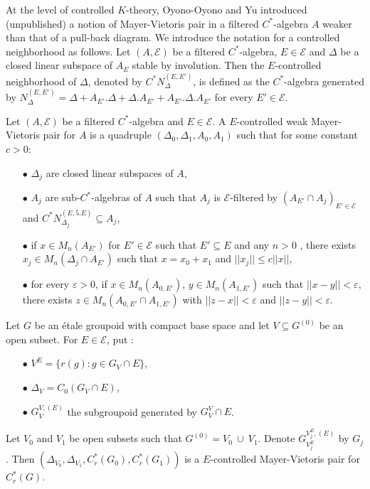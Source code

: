 At the level of controlled $K$-theory, Oyono-Oyono and Yu introduced (unpublished) a notion of Mayer-Vietoris pair in a filtered $C^*$-algebra $A$ weaker than that of a pull-back diagram. We introduce the notation for a controlled neighborhood as follows. Let $(A,\mathcal E)$ be a filtered $C^*$-algebra, $E\in\mathcal E$ and $\Delta$ be a closed linear subspace of $A_E$ stable by involution. Then the $E$-controlled neighborhood of $\Delta$, denoted by $C^* N_{\Delta}^{(E,E')}$, is defined as the $C^*$-algebra generated by $N_{\Delta}^{(E,E')} = \Delta + A_{E'}.\Delta +\Delta. A_{E'} + A_{E'}.\Delta.A_{E'} $ for every $E'\in\mathcal E$.

\begin{definition} \label{MVpair}
Let $(A,\mathcal E)$ be a filtered $C^*$-algebra and $E \in\mathcal E$. A $E$-controlled weak Mayer-Vietoris pair for $A$ is a quadruple $(\Delta_0,\Delta_1,A_0,A_1)$ such that for some constant $c>0$:\\

\begin{itemize}
\item[$\bullet$] $\Delta_j$ are closed linear subspaces of $A$, 
\item[$\bullet$] $A_j$ are sub-$C^*$-algebras of $A$ such that $A_j$ is $\mathcal E$-filtered by $(A_{E'}\cap A_j)_{E'\in\mathcal E}$ and $C^* N_{\Delta_j}^{(E,5.E)}\subseteq A_j$,
\item[$\bullet$] if $x\in M_n(A_{E'})$ for $E'\in\mathcal E$ such that $E'\subseteq E$ and any $n>0$ , there exists $x_j\in M_n(\Delta_j\cap A_{E'})$ such that $x=x_0+x_1$ and $||x_j||\leq c||x||$,
\item[$\bullet$] for every $\varepsilon >0$, if $x\in M_n(A_{0,E'})$, $y\in M_n(A_{1,E'})$ such that $||x-y||<\varepsilon$,  there exists $z\in M_n(A_{0,E'}\cap A_{1,E'})$ with $||z-x||<\varepsilon$ and $||z-y||<\varepsilon$. \\
\end{itemize}
\end{definition}

\begin{Expl} Let $G$ be an étale groupoid with compact base space and let $V\subseteq G^{(0)}$ be an open subset. For $E\in\mathcal E$, put :
\begin{itemize}
\item[$\bullet$] $V^E= \{r(g) : g\in G_{V}\cap E\}$,
\item[$\bullet$] $\Delta_V = C_0(G_{V}\cap E)$,
\item[$\bullet$] $G^{V,(E)}_V$ the subgroupoid generated by $G_V^V \cap E$.
\end{itemize} 
Let $V_0$ and $V_1$ be open subsets such that $G^{(0)} = V_0\ \cup \ V_1$. Denote $G_{V_j^E}^{V_j^E , (E)}$ by $G_j$. Then $(\Delta_{V_0},\Delta_{V_1}, C_r^*(G_0),C_r^*(G_1))$ is a $E$-controlled Mayer-Vietoris pair for $C^*_r (G)$. 
\end{Expl}

